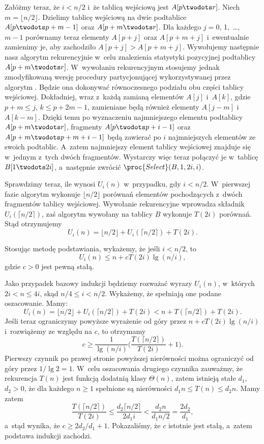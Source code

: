 Załóżmy teraz, że $i<n/2$ i~że tablicą wejściową jest $A[p\twodots r]$. Niech $m=\lfloor n/2\rfloor$. Dzielimy tablicę wejściową na dwie podtablice $A[p\twodots p+m-1]$ oraz $A[p+m\twodots r]$. Dla każdego $j=0$, 1,~\dots,~$m-1$ porównamy teraz elementy $A[p+j]$ oraz $A[p+m+j]$ i~ewentualnie zamienimy je, aby zachodziło $A[p+j]>A[p+m+j]$. Wywołujemy następnie nasz algorytm rekurencyjnie w~celu znalezienia  statystyki pozycyjnej podtablicy $A[p+m\twodots r]$. W~wywołaniu rekurencyjnym stosujemy jednak zmodyfikowaną wersję procedury partycjonującej wykorzystywanej przez algorytm . Będzie ona dokonywać równoczesnego podziału obu części tablicy wejściowej. Dokładniej, wraz z~każdą zamianą elementów $A[j]$ i~$A[k]$, gdzie $p+m\le j$, $k\le p+2m-1$, zamieniane będą również elementy $A[j-m]$ i~$A[k-m]$. Dzięki temu po wyznaczeniu  najmniejszego elementu podtablicy $A[p+m\twodots r]$, fragmenty $A[p\twodots p+i-1]$ oraz $A[p+m\twodots p+m+i-1]$ będą zawierać po $i$ najmniejszych elementów ze swoich podtablic. A~zatem  najmniejszy element tablicy wejściowej znajduje się w~jednym z~tych dwóch fragmentów. Wystarczy więc teraz połączyć je w~tablicę $B[1\twodots2i]$, a~następnie zwrócić $\proc{Select}(B,1,2i,i)$.

Sprawdzimy teraz, ile wynosi $U_i(n)$ w~przypadku, gdy $i<n/2$. W~pierwszej fazie algorytm wykonuje $\lfloor n/2\rfloor$ porównań elementów pochodzących z~dwóch fragmentów tablicy wejściowej. Wywołanie rekurencyjne wprowadza składnik $U_i(\lceil n/2\rceil)$, zaś algorytm  wywołany na tablicy $B$ wykonuje $T(2i)$ porównań. Stąd otrzymujemy
\[
    U_i(n) = \lfloor n/2\rfloor+U_i(\lceil n/2\rceil)+T(2i).
\]

\subproblem %
Stosując metodę podstawiania, wykażemy, że jeśli $i<n/2$, to
\[
	U_i(n) \le n+cT(2i)\lg(n/i),
\]
gdzie $c>0$ jest pewną stałą.

Jako przypadek bazowy indukcji będziemy rozważać wyrazy $U_i(n)$, w~których $2i<n\le4i$, skąd $n/4\le i<n/2$. Wykażemy, że spełniają one podane oszacowanie. Mamy:
\[
    U_i(n) = \lfloor n/2\rfloor+U_i(\lceil n/2\rceil)+T(2i) < n+T(\lceil n/2\rceil)+T(2i).
\]
Jeśli teraz ograniczymy powyższe wyrażenie od góry przez $n+cT(2i)\lg(n/i)$ i~rozwiążemy ze względu na $c$, to otrzymamy
\[
    c \ge \frac{1}{\lg(n/i)}\biggl(\frac{T(\lceil n/2\rceil)}{T(2i)}+1\biggr).
\]
Pierwszy czynnik po prawej stronie powyższej nierówności można ograniczyć od góry przez $1/\lg2=1$. W~celu oszacowania drugiego czynnika zauważmy, że rekurencja $T(n)$ jest funkcją dodatnią klasy $\Theta(n)$, zatem istnieją stałe $d_1$, $d_2>0$, że dla każdego $n\ge1$ spełnione są nierówności $d_1n\le T(n)\le d_2n$. Mamy zatem
\[
    \frac{T(\lceil n/2\rceil)}{T(2i)} \le \frac{d_2\lceil n/2\rceil}{2d_1i} < \frac{d_2n}{d_1n/2} = \frac{2d_2}{d_1},
\]
a~stąd wynika, że $c\ge2d_2/d_1+1$. Pokazaliśmy, że $c$ istotnie jest stałą, a~zatem podstawa indukcji zachodzi.

